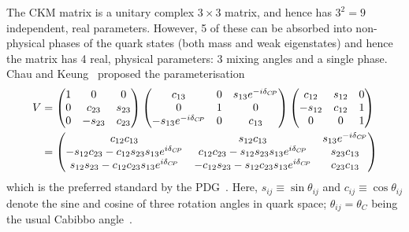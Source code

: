 The CKM matrix is a unitary complex $3\times3$ matrix, and hence has $3^2=9$ independent, real parameters. However, 5 of these can be absorbed into non-physical phases of the quark states (both mass and weak eigenstates) and hence the matrix has 4 real, physical parameters: 3 mixing angles and a single phase. Chau and Keung~\cite{chauCommentsParametrizationKobayashiMaskawa1984} proposed the parameterisation
\begin{align}
\begin{split}\label{eq:CK_CKM_matrix}
        V &= 
        \begin{pmatrix}
            1 & 0 & 0 \\ 0 & c_{23} & s_{23} \\ 0 & -s_{23} & c_{23}
        \end{pmatrix}
        \begin{pmatrix}
            c_{13} & 0 & s_{13}e^{-i\delta_{{C\!P}}} \\ 0 & 1 & 0 \\ -s_{13}e^{-i\delta_{{C\!P}}} & 0 & c_{13}
        \end{pmatrix}
        \begin{pmatrix}
            c_{12} & s_{12}  & 0 \\ -s_{12} & c_{12} & 1 \\ 0 & 0 & 1
        \end{pmatrix}
        \\
        &=
        \begin{pmatrix}
            c_{12}c_{13} & s_{12}c_{13} & s_{13}e^{-i\delta_{{C\!P}}} \\
            -s_{12}c_{23}-c_{12}s_{23}s_{13}e^{i\delta_{{C\!P}}} &
            c_{12}c_{23}-s_{12}s_{23}s_{13}e^{i\delta_{{C\!P}}} &
            s_{23}c_{13} \\
            s_{12}s_{23}-c_{12}c_{23}s_{13}e^{i\delta_{{C\!P}}} &
            -c_{12}s_{23}-s_{12}c_{23}s_{13}e^{i\delta_{{C\!P}}} &
            c_{23}c_{13} \\
        \end{pmatrix}
\end{split}
\end{align}
which is the preferred standard by the PDG~\cite{PDG2019}. Here, $s_{ij}\equiv\sin \theta_{ij}$ and $c_{ij}\equiv\cos \theta_{ij}$ denote the sine and cosine of three rotation angles in quark space; $\theta_{ij}=\theta_C$ being the usual Cabibbo angle~\cite{cabibboUnitarySymmetryLeptonic1963}.

